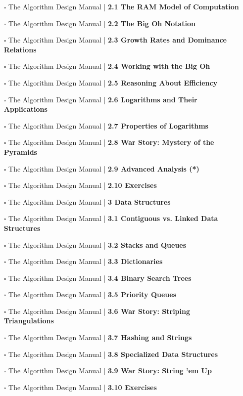 \documentclass[a4, landscape, 12pt]{article}
\newcommand{\checkbox}{$\square$}%
\begin{document}
\begin{itemize}
{}
\item [\checkbox]  The Algorithm Design Manual | \textbf{ 2.1 The RAM Model of Computation
}
\item [\checkbox]  The Algorithm Design Manual | \textbf{ 2.2 The Big Oh Notation
}
\item [\checkbox]  The Algorithm Design Manual | \textbf{ 2.3 Growth Rates and Dominance Relations
}
\item [\checkbox]  The Algorithm Design Manual | \textbf{ 2.4 Working with the Big Oh
}
\item [\checkbox]  The Algorithm Design Manual | \textbf{ 2.5 Reasoning About Efficiency
}
\item [\checkbox]  The Algorithm Design Manual | \textbf{ 2.6 Logarithms and Their Applications
}
\item [\checkbox]  The Algorithm Design Manual | \textbf{ 2.7 Properties of Logarithms
}
\item [\checkbox]  The Algorithm Design Manual | \textbf{ 2.8 War Story: Mystery of the Pyramids
}
\item [\checkbox]  The Algorithm Design Manual | \textbf{ 2.9 Advanced Analysis (*)
}
\item [\checkbox]  The Algorithm Design Manual | \textbf{ 2.10 Exercises
}
\item [\checkbox]  The Algorithm Design Manual | \textbf{ 3 Data Structures
}
\item [\checkbox]  The Algorithm Design Manual | \textbf{ 3.1 Contiguous vs. Linked Data Structures
}
\item [\checkbox]  The Algorithm Design Manual | \textbf{ 3.2 Stacks and Queues
}
\item [\checkbox]  The Algorithm Design Manual | \textbf{ 3.3 Dictionaries
}
\item [\checkbox]  The Algorithm Design Manual | \textbf{ 3.4 Binary Search Trees
}
\item [\checkbox]  The Algorithm Design Manual | \textbf{ 3.5 Priority Queues
}
\item [\checkbox]  The Algorithm Design Manual | \textbf{ 3.6 War Story: Striping Triangulations
}
\item [\checkbox]  The Algorithm Design Manual | \textbf{ 3.7 Hashing and Strings
}
\item [\checkbox]  The Algorithm Design Manual | \textbf{ 3.8 Specialized Data Structures
}
\item [\checkbox]  The Algorithm Design Manual | \textbf{ 3.9 War Story: String ’em Up
}
\item [\checkbox]  The Algorithm Design Manual | \textbf{ 3.10 Exercises
}
\end{itemize}
\end{document}
